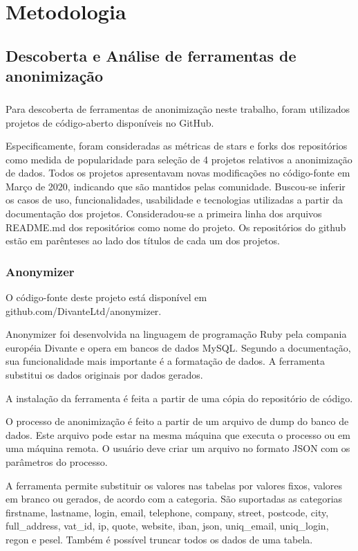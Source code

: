 \chapter{Metodologia}
\label{cap3}

\section{Descoberta e Análise de ferramentas de anonimização}

\paragraph{}
Para descoberta de ferramentas de anonimização neste trabalho, foram utilizados projetos de código-aberto disponíveis no GitHub. 

Especificamente, foram consideradas as métricas de stars e forks dos repositórios como medida de popularidade para seleção de 4 projetos relativos a anonimização de dados. Todos os projetos apresentavam novas modificações no código-fonte em Março de 2020, indicando que são mantidos pelas comunidade. Buscou-se inferir os casos de uso, funcionalidades, usabilidade e tecnologias utilizadas a partir da documentação dos projetos. Consideradou-se a primeira linha dos arquivos README.md dos repositórios como nome do projeto. Os repositórios do github estão em parênteses ao lado dos títulos de cada um dos projetos.

\subsection{Anonymizer}

O código-fonte deste projeto está disponível em github.com/DivanteLtd/anonymizer.

Anonymizer foi desenvolvida na linguagem de programação Ruby pela compania européia Divante e opera em bancos de dados MySQL. Segundo a documentação, sua funcionalidade mais importante é a formatação de dados. A ferramenta substitui os dados originais por dados gerados.

A instalação da ferramenta é feita a partir de uma cópia do repositório de código. 

O processo de anonimização é feito a partir de um arquivo de dump do banco de dados. Este arquivo pode estar na mesma máquina que executa o processo ou em uma máquina remota. O usuário deve criar um arquivo no formato JSON com os parâmetros do processo.

A ferramenta permite substituir os valores nas tabelas por valores fixos, valores em branco ou gerados, de acordo com a categoria. São suportadas as categorias firstname, lastname, login, email, telephone, company, street, postcode, city, full{\_}address, vat{\_}id, ip, quote, website, iban, json, uniq{\_}email, uniq{\_}login, regon e pesel. Também é possível truncar todos os dados de uma tabela.

